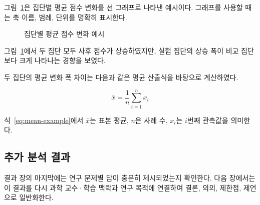 
그림~\ref{fig:graph-example}은 집단별 평균 점수 변화를 선 그래프로 나타낸 예시이다.
그래프를 사용할 때는 축 이름, 범례, 단위를 명확히 표시한다.

\begin{figure}[htbp]
    \centering
    \caption{집단별 평균 점수 변화 예시}
    \label{fig:graph-example}
\end{figure}


그림~\ref{fig:graph-example}에서 두 집단 모두 사후 점수가 상승하였지만,
실험 집단의 상승 폭이 비교 집단보다 크게 나타나는 경향을 보였다.

두 집단의 평균 변화 폭 차이는 다음과 같은 평균 산출식을 바탕으로 계산하였다.

\begin{equation}
    \bar{x} = \frac{1}{n}\sum_{i=1}^{n} x_i
    \label{eq:mean-example}
\end{equation}

식~\ref{eq:mean-example}에서 \(\bar{x}\)는 표본 평균, \(n\)은 사례 수, \(x_i\)는 \(i\)번째 관측값을 의미한다.

\subsection{추가 분석 결과}

%

결과 장의 마지막에는 연구 문제별 답이 충분히 제시되었는지 확인한다.
다음 장에서는 이 결과를 다시 과학 교수·학습 맥락과 연구 목적에 연결하여 결론, 의의, 제한점, 제언으로 일반화한다.
